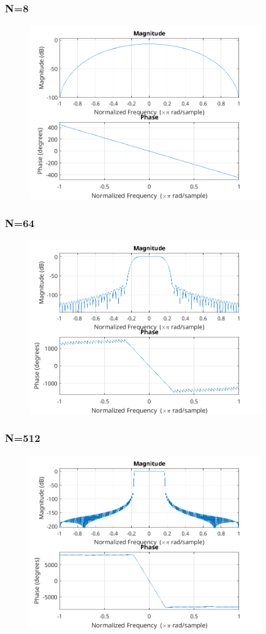 \documentclass{article}
\begin{document}
  \subsubsection{N=8}
  \begin{figure}[!ht]
  \includegraphics[width=10cm]{freqz_bl_8.png}
  \end{figure}

  \subsubsection{N=64}
  \begin{figure}[!ht]
  \includegraphics[width=10cm]{freqz_bl_64.png}
  \end{figure}
  \subsubsection{N=512}
  \begin{figure}[!ht]
  \includegraphics[width=10cm]{freqz_bl_512.png}
  \end{figure}
\end{document}

